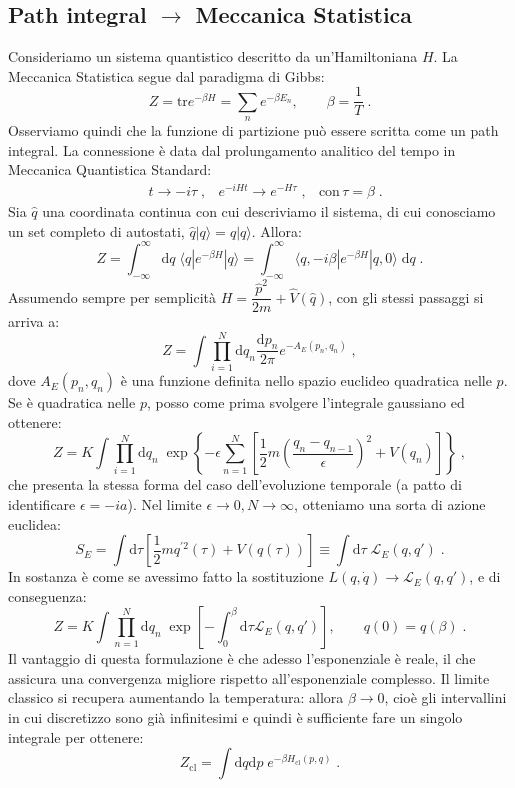 \documentclass[12pt,a4paper]{article}
\theoremstyle{definition}
\newcommand{\lag}{\mathcal{L}}
\numberwithin{equation}{section}
\newcommand{\diff}[1][]{\mathrm{d}#1}
\newcommand{\bra}{\langle}
\newcommand{\ket}{\rangle}
\newcommand{\tr}{\mathrm{tr}}
\begin{document}
\subsection{Path integral $\to$ Meccanica Statistica}
Consideriamo un sistema quantistico descritto da un'Hamiltoniana $H$. La Meccanica Statistica segue dal paradigma di Gibbs:
$$
Z=\tr e^{-\beta H}=\sum_n e^{-\beta E_n},\qquad \beta=\frac{1}{T}\;.
$$
Osserviamo quindi che la funzione di partizione può essere scritta come un path integral. La connessione è data dal prolungamento analitico del tempo in Meccanica Quantistica Standard:
\begin{equation}
\begin{matrix}
&t\to -i\tau\;, & e^{-iHt}\to e^{-H\tau}\;, & \mbox{con}\, \tau=\beta\;.
\end{matrix}
\end{equation}
Sia $\hat{q}$ una coordinata continua con cui descriviamo il sistema, di cui conosciamo un set completo di autostati, $\hat{q}|q\ket=q|q\ket$. Allora:
\begin{equation}
Z=\int_{-\infty}^{\infty}\diff{q}\; \bra q|e^{-\beta H}|q\ket=\int_{-\infty}^{\infty}\bra q,-i\beta|e^{-\beta H}|q,0\ket\;\diff{q}\;.
\end{equation}
Assumendo sempre per semplicità $H=\dfrac{\hat{p}^2}{2m}+\hat{V}(\hat{q})$, con gli stessi passaggi si arriva a:
\begin{equation}
\boxed{
Z=\int\prod_{i=1}^N\diff{q}_n\frac{\diff{p}_n}{2\pi}e^{-A_E(p_n,q_n)}
}\;,
\end{equation}
dove $A_E(p_n,q_n)$ è una funzione definita nello spazio euclideo quadratica nelle $p$. Se è quadratica nelle $p$, posso come prima svolgere l'integrale gaussiano ed ottenere:
\begin{equation}
Z=K\int\prod_{i=1}^N\diff{q}_n\;\exp\left\{-\epsilon\sum_{n=1}^N\left[\frac{1}{2}m\left(\frac{q_n-q_{n-1}}{\epsilon}\right)^2+V(q_n)\right]\right\}\;,
\end{equation}
che presenta la stessa forma del caso dell'evoluzione temporale (a patto di identificare $\epsilon=-ia$). Nel limite $\epsilon\to0,N\to\infty$, otteniamo una sorta di azione euclidea:
\begin{equation}
S_E=\int\diff{\tau}\left[\frac{1}{2}mq^{'2}(\tau)+V(q(\tau))\right]\equiv\int\diff{\tau}\;\lag_E(q,q')\;.
\end{equation}
In sostanza è come se avessimo fatto la sostituzione $L(q,\dot{q})\to \lag_E(q,q')$, e di conseguenza:
\begin{equation}
Z=K\int\prod_{n=1}^N\diff{q}_n\;\exp\left[-\int_0^{\beta}\diff{\tau}\lag_E(q,q')\right],\qquad q(0)=q(\beta)\;.
\end{equation}
Il vantaggio di questa formulazione è che adesso l'esponenziale è reale, il che assicura una convergenza migliore rispetto all'esponenziale complesso. Il limite classico si recupera aumentando la temperatura: allora $\beta\to 0$, cioè gli intervallini in cui discretizzo sono già infinitesimi e quindi è sufficiente fare un singolo integrale per ottenere:
\begin{equation}
Z_{\mathrm{cl}}=\int\diff{q}\diff{p}\; e^{-\beta H_{\mathrm{cl}}(p,q)}\;.
\end{equation}
\end{document}
